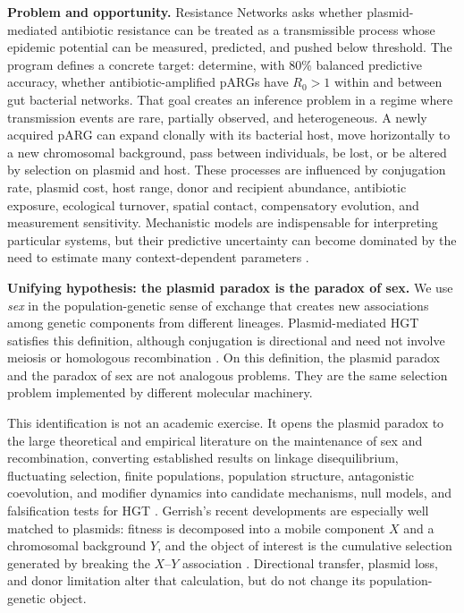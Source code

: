 \documentclass[12pt,a4paper]{article}
\begin{document}
\textbf{Problem and opportunity.} Resistance Networks asks whether plasmid-mediated antibiotic resistance can be treated as a transmissible process whose epidemic potential can be measured, predicted, and pushed below threshold. The program defines a concrete target: determine, with 80\% balanced predictive accuracy, whether antibiotic-amplified pARGs have $R_0>1$ within and between gut bacterial networks. That goal creates an inference problem in a regime where transmission events are rare, partially observed, and heterogeneous. A newly acquired pARG can expand clonally with its bacterial host, move horizontally to a new chromosomal background, pass between individuals, be lost, or be altered by selection on plasmid and host. These processes are influenced by conjugation rate, plasmid cost, host range, donor and recipient abundance, antibiotic exposure, ecological turnover, spatial contact, compensatory evolution, and measurement sensitivity. Mechanistic models are indispensable for interpreting particular systems, but their predictive uncertainty can become dominated by the need to estimate many context-dependent parameters \citep{dewan2023,hernandez2021,brockhurst2022}.

\textbf{Unifying hypothesis: the plasmid paradox is the paradox of sex.} We use \emph{sex} in the population-genetic sense of exchange that creates new associations among genetic components from different lineages. Plasmid-mediated HGT satisfies this definition, although conjugation is directional and need not involve meiosis or homologous recombination \citep{redfield2001,harrison2012}. On this definition, the plasmid paradox and the paradox of sex are not analogous problems. They are the same selection problem implemented by different molecular machinery.

This identification is not an academic exercise. It opens the plasmid paradox to the large theoretical and empirical literature on the maintenance of sex and recombination, converting established results on linkage disequilibrium, fluctuating selection, finite populations, population structure, antagonistic coevolution, and modifier dynamics into candidate mechanisms, null models, and falsification tests for HGT \citep{ottolenormand2002,otto2009}. Gerrish's recent developments are especially well matched to plasmids: fitness is decomposed into a mobile component $X$ and a chromosomal background $Y$, and the object of interest is the cumulative selection generated by breaking the $X$--$Y$ association \citep{gerrish2026sex}. Directional transfer, plasmid loss, and donor limitation alter that calculation, but do not change its population-genetic object.
\end{document}
